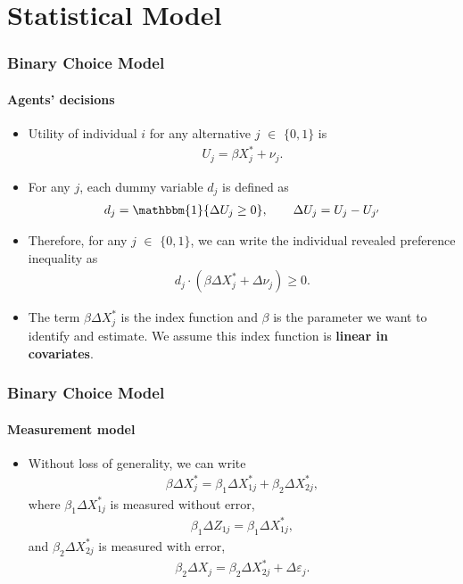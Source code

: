 \documentclass[notes=show]{beamer}
\begin{document}
\section{Statistical Model}
\begin{frame}
\frametitle{Binary Choice Model}
\framesubtitle{Agents' decisions}

\begin{itemize}
	\item Utility of individual $i$ for any alternative $j$ $\in$ $\{0,1\}$ is
	\begin{align*}
	U_{j}=\beta X^{*}_{j} + \nu_{j}.
	\end{align*}
	\item For any $j$, each dummy variable $d_{j}$ is defined as
	\begin{align*}
	d_{j} = \mathbbm{1}\{\Delta U_{j}\geq 0\},\qquad\Delta U_{j} = U_{j}-U_{j'}
	\end{align*}
	\item Therefore, for any $j$ $\in$ $\{0,1\}$, we can write the individual revealed preference inequality as
	\begin{align*}
	d_{j} \cdot (\beta\Delta X^{*}_{j}+\Delta\nu_{j})\geq 0.
	\end{align*}
	\item The term $\beta\Delta X^{*}_{j}$ is the index function and $\beta$ is the parameter we want to identify and estimate. We assume this index function is \textbf{linear in covariates}.
\end{itemize}
\end{frame}
\begin{frame}
\frametitle{Binary Choice Model}
\framesubtitle{Measurement model}

\begin{itemize}
	\item Without loss of generality, we can write 
	\begin{align*}
	\beta\Delta X^{*}_{j} = \beta_{1}\Delta X^{*}_{1j} + \beta_{2}\Delta X^{*}_{2j},
	\end{align*}
	where $\beta_{1}\Delta X^{*}_{1j}$ is measured without error,
	\begin{align*}
	\beta_{1}\Delta Z_{1j} = \beta_{1}\Delta X^{*}_{1j},
	\end{align*}
	and $\beta_{2}\Delta X^{*}_{2j}$ is measured with error,
	\begin{align*}
	\beta_{2}\Delta X_{j} = \beta_{2}\Delta X^{*}_{2j}+\Delta\varepsilon_{j}.
	\end{align*}
\end{itemize}
\end{frame}
\end{document}
